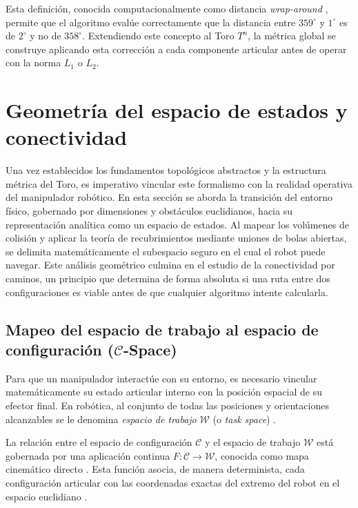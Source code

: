 Esta definición, conocida computacionalmente como distancia \textit{wrap-around} \parencite{lynch2017modern}, permite 
que el algoritmo evalúe correctamente que la distancia entre 
$359^\circ$ y $1^\circ$ es de $2^\circ$ y no de $358^\circ$. Extendiendo este concepto al 
Toro $T^n$, la métrica global se construye aplicando esta corrección a 
cada componente articular antes de operar con la norma $L_1$ o $L_2$.


\section{Geometría del espacio de estados y conectividad}

Una vez establecidos los fundamentos topológicos abstractos y la estructura métrica del Toro, 
es imperativo vincular este formalismo con la realidad operativa del manipulador robótico. 
En esta sección se aborda la transición del entorno físico, gobernado por dimensiones y 
obstáculos euclidianos, hacia su representación analítica como un espacio de estados. Al 
mapear los volúmenes de colisión y aplicar la teoría de recubrimientos mediante uniones de 
bolas abiertas, se delimita matemáticamente el subespacio seguro en el cual el robot puede 
navegar. Este análisis geométrico culmina en el estudio de la conectividad por caminos, un 
principio que determina de forma absoluta si una ruta entre dos configuraciones es 
viable antes de que cualquier algoritmo intente calcularla.



\subsection{Mapeo del espacio de trabajo al espacio de configuración ($\mathcal{C}$-Space)}

Para que un manipulador interactúe con su entorno, es necesario vincular 
matemáticamente su estado articular interno con la posición espacial de su efector 
final. En robótica, al conjunto de todas las posiciones y orientaciones alcanzables 
se le denomina \textit{espacio de trabajo} $\mathcal{W}$ (o \textit{task space}) \parencite{lynch2017modern}.

La relación entre el espacio de configuración $\mathcal{C}$ y el espacio de 
trabajo $\mathcal{W}$ está gobernada por una aplicación continua 
$F: \mathcal{C} \to \mathcal{W}$, conocida como mapa 
cinemático directo \parencite{grant2015topology}. Esta función asocia, 
de manera determinista, cada configuración articular con las coordenadas 
exactas del extremo del robot en el espacio euclidiano \parencite{grant2015topology}.

